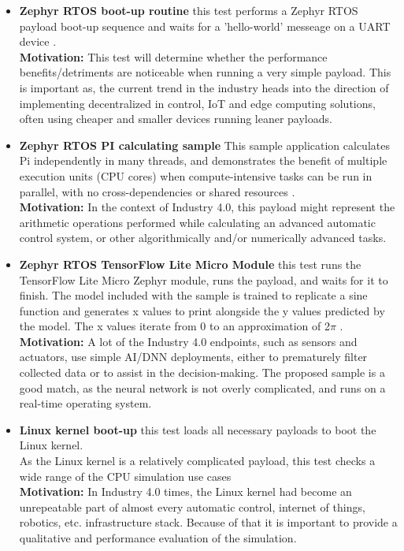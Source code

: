 \begin{itemize}
    \item{\textbf{Zephyr RTOS boot-up routine} this test performs a Zephyr RTOS payload boot-up sequence and waits for
    a 'hello-world' messeage on a UART device \cite{ZephyrHello}.\\
    \textbf{Motivation:} This test will determine whether the performance benefits/detriments are noticeable when
    running a very simple payload. This is important as, the current trend in the industry heads into the
    direction of implementing decentralized in control, IoT and edge computing solutions, often using cheaper and
    smaller devices running leaner payloads.}
    \item{\textbf{Zephyr RTOS PI calculating sample} This sample application calculates Pi independently in many
    threads, and demonstrates the benefit of multiple execution units (CPU cores) when compute-intensive tasks can be
    run in parallel, with no cross-dependencies or shared resources \cite{ZephyrPi}.\\
    \textbf{Motivation:} In the context of Industry 4.0, this payload might represent the arithmetic operations
    performed while calculating an advanced automatic control system, or other algorithmically and/or numerically
    advanced tasks.}
    \item{\textbf{Zephyr RTOS TensorFlow Lite Micro Module} this test runs the TensorFlow Lite Micro Zephyr module,
    runs the payload, and waits for it to finish. The model included with the sample is trained to replicate a sine
    function and generates x values to print alongside the y values predicted by the model. The x values iterate from 0
    to an approximation of 2$\pi$ \cite{ZephyrTF}.\\
    \textbf{Motivation:} A lot of the Industry 4.0 endpoints, such as sensors and actuators, use simple AI/DNN
    deployments, either to prematurely filter collected data or to assist in the decision-making. The proposed sample
    is a good match, as the neural network is not overly complicated, and runs on a real-time operating system.}
    \item{\textbf{Linux kernel boot-up} this test loads all necessary payloads to boot the Linux kernel.\\
    As the Linux kernel is a relatively complicated payload, this test checks a wide range of the CPU simulation use
    cases\\
    \textbf{Motivation:} In Industry 4.0 times, the Linux kernel had become an unrepeatable part of almost every
    automatic control, internet of things, robotics, etc. infrastructure stack. Because of that it is important to
    provide a qualitative and performance evaluation of the simulation.}
\end{itemize}

